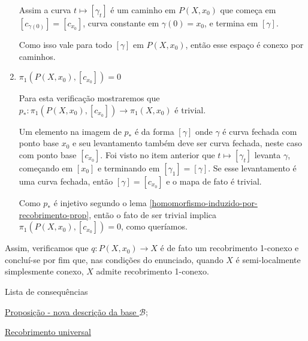 \begin{dem}
\begin{enumerate}
            Assim a curva $t\mapsto [\gamma_t]$ é um caminho em $P(X,x_0)$ que começa em $[c_{\gamma(0)}]=[c_{x_0}]$, curva constante em $\gamma(0)=x_0$, e termina em $[\gamma]$.

            Como isso vale para todo $[\gamma]$ em $P(X, x_0)$, então esse espaço é conexo por caminhos.\newline
        
        \item $\pi_1(P(X,x_0), [c_{x_0}])=0$\newline
        
            Para esta verificação mostraremos que $p_*: \pi_1(P(X,x_0), [c_{x_0}])\rightarrow \pi_1(X,x_0)$ é trivial.\newline

            Um elemento na imagem de $p_*$ é da forma $[\gamma]$ onde $\gamma$ é curva fechada com ponto base $x_0$ e seu levantamento também deve ser curva fechada, neste caso com ponto base $[c_{x_0}]$. Foi visto no item anterior que $t\mapsto [\gamma_t]$ levanta $\gamma$, começando em $[x_0]$ e terminando em $[\gamma_1]=[\gamma]$. Se esse levantamento é uma curva fechada, então $[\gamma]=[c_{x_0}]$ e o mapa de fato é trivial.

            Como $p_*$ é injetivo segundo o lema \ref{homomorfismo-induzido-por-recobrimento-prop}, então o fato de ser trivial implica $\pi_1(P(X,x_0), [c_{x_0}])=0$, como queríamos.\newline
        
    \end{enumerate}

    Assim, verificamos que $q: P(X,x_0)\rightarrow X$ é de fato um recobrimento 1-conexo e concluí-se por fim que, nas condições do enunciado, quando $X$ é semi-localmente simplesmente conexo, $X$ admite recobrimento 1-conexo.
    
\end{dem}

\begin{titlemize}{Lista de consequências}
	\item \hyperref[pertence-a-base-se-e-somente-se-possui-i-trivial]{Proposição - nova descrição da base $\mathcal{B}$};\\ %
    \item \hyperref[recobrimento-universal]{Recobrimento universal}
\end{titlemize}
